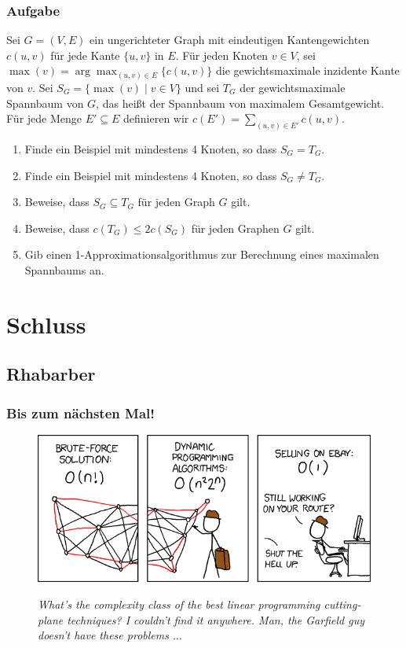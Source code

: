 \begin{frame}
	\frametitle{Aufgabe}
	
	Sei $G=(V,E)$ ein ungerichteter Graph mit eindeutigen Kantengewichten $c(u,v)$ für jede Kante $\{u,v\}$ in $E$.
Für jeden Knoten $v \in V$, sei $\max(v)=\arg\max_{(u,v)\in E}\{c(u,v)\}$ die gewichtsmaximale inzidente Kante von $v$.
Sei $S_G=\{\max(v) \mid v \in V\}$ und sei $T_G$ der gewichtsmaximale Spannbaum von $G$, das heißt der Spannbaum von maximalem Gesamtgewicht.
Für jede Menge $E' \subseteq E$ definieren wir $c(E')=\sum_{(u,v)\in E'}c(u,v)$.
\begin{enumerate}
 \item Finde ein Beispiel mit mindestens 4 Knoten, so dass $S_G=T_G$.
 \item Finde ein Beispiel mit mindestens 4 Knoten, so dass $S_G\not=T_G$.
 \item Beweise, dass $S_G\subseteq T_G$ für jeden Graph $G$ gilt.
 \item Beweise, dass $c(T_G)\leq 2c(S_G)$ für jeden Graphen $G$ gilt.
 \item Gib einen 1-Approximationsalgorithmus zur Berechnung eines maximalen Spannbaums an.
\end{enumerate}
\end{frame}

\section{Schluss}
\subsection{Rhabarber}

\begin{frame}
	\frametitle{Bis zum nächsten Mal!}
	
	\begin{figure}[H]
		\includegraphics[width= \textwidth]{images/399_traveling_salesman}
		
		\textit{\scriptsize{What's the complexity class of the best linear programming cutting-plane techniques? I couldn't find it anywhere. Man, the Garfield guy doesn't have these problems $\ldots$}}
		
	\end{figure}
\end{frame}


